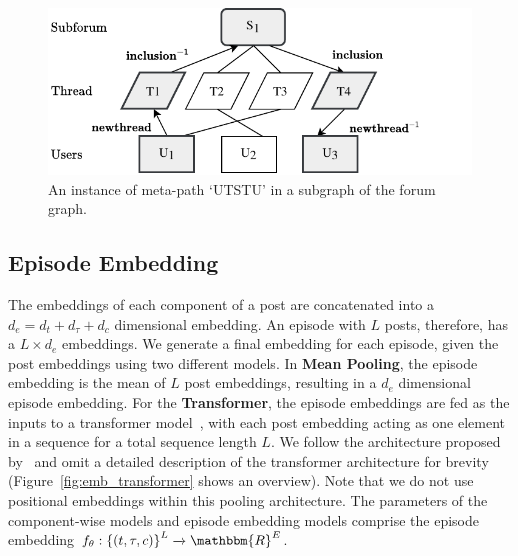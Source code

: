 \begin{figure}
    \centering
    \includegraphics[width=\linewidth]{sysml/figures/metapathExample.pdf}
    \caption{An instance of meta-path ‘UTSTU’ in a subgraph of the forum graph.}
    \label{fig:metapath}
\end{figure}

\subsection{Episode Embedding}
The embeddings of each component of a post are concatenated into a $d_e = d_t + d_{\tau} + d_c$ dimensional embedding.
An episode with $L$ posts, therefore, has a $L \times d_e$ embeddings. 
We generate a final embedding for each episode, given the post embeddings using two different models.
In \textbf{Mean Pooling}, the episode embedding is the mean of $L$ post embeddings, resulting in a $d_e$ dimensional episode embedding.
For the \textbf{Transformer}, the episode embeddings are fed as the inputs to a transformer model~\cite{devlin2019bert,vaswani2017attention}, with each post embedding acting as one element in a sequence for a total sequence length $L$. 
We follow the architecture proposed by~\citet{andrews2019learning} and omit a detailed description of the transformer architecture for brevity (Figure~\ref{fig:emb_transformer} shows an overview).
Note that we do not use positional embeddings within this pooling architecture.
The parameters of the component-wise models and episode embedding models comprise the episode embedding $f_{\theta}: \left\{(t, \tau, c)\right\}^L \xrightarrow[]{} \mathbbm{R} ^ E$.

